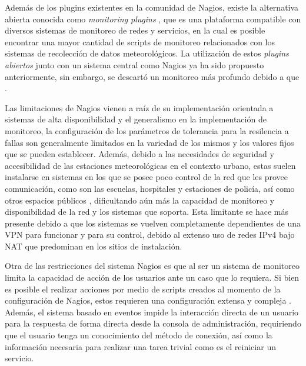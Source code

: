 Además de los plugins existentes en la comunidad de Nagios, existe la alternativa abierta conocida como \textit{monitoring plugins} \cite{monitoring_plugins}, que es una plataforma compatible con diversos sistemas de monitoreo de redes y servicios, en la cual es posible encontrar una mayor cantidad de scripts de monitoreo relacionados con los sistemas de recolección de datos meteorológicos. La utilización de estos \textit{plugins abiertos} junto con un sistema central como Nagios ya ha sido propuesto anteriormente, sin embargo, se descartó un monitoreo más profundo debido a que  \cite{monitoreo_raspberry_nagios}.

Las limitaciones de Nagios vienen a raíz de su implementación orientada a sistemas de alta disponibilidad y el generalismo en la implementación de monitoreo, la configuración de los parámetros de tolerancia para la resilencia a fallas son generalmente limitados en la variedad de los mismos y los valores fijos que se pueden establecer. Además, debido a las necesidades de seguridad y accesibilidad de las estaciones meteorológicas en el contexto urbano, estas suelen instalarse en sistemas en los que se posee poco control de la red que les provee comunicación, como son las escuelas, hospitales y estaciones de policía, así como otros espacios públicos \cite{muller_sensors_and_the_city}, dificultando aún más la capacidad de monitoreo y disponibilidad de la red y los sistemas que soporta. Esta limitante se hace más presente debido a que los sistemas se vuelven completamente dependientes de una VPN para funcionar y para su control, debido al extenso uso de redes IPv4 bajo NAT que predominan en los sitios de instalación.

Otra de las restricciones del sistema Nagios es que al ser un sistema de monitoreo limita la capacidad de acción de los usuarios ante un caso que lo requiera. Si bien es posible el realizar acciones por medio de scripts creados al momento de la configuración de Nagios, estos requieren una configuración extensa y compleja \cite{nagios_service_restart}. Además, el sistema basado en eventos impide la interacción directa de un usuario para la respuesta de forma directa desde la consola de administración, requiriendo que el usuario tenga un conocimiento del método de conexión, así como la información necesaria para realizar una tarea trivial como es el reiniciar un servicio.

